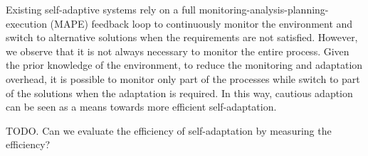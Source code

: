 Existing self-adaptive systems rely on a full monitoring-analysis-planning-execution (MAPE) feedback loop to continuously monitor the environment and switch to alternative solutions when the requirements are not satisfied.
However, we observe that it is not always necessary to monitor the entire process. Given the prior knowledge of the environment, to reduce the monitoring and adaptation overhead, it is possible to monitor only part of the processes while switch to part of the solutions when the adaptation is required. 
In this way, cautious adaption can be seen as a means towards more efficient self-adaptation.

TODO. Can we evaluate the efficiency of self-adaptation by measuring the efficiency?